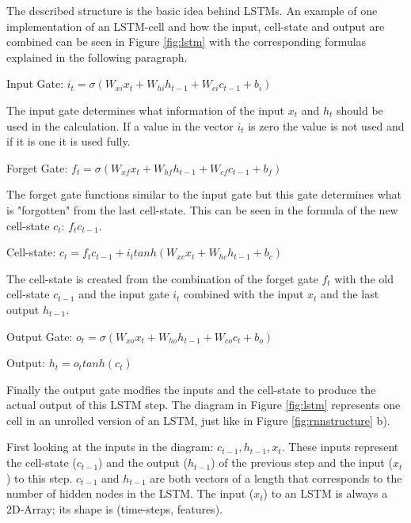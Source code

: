 The described structure is the basic idea behind LSTMs.
An example of one implementation of an LSTM-cell and how the input, cell-state and output are combined can be seen in Figure \ref{fig:lstm} with the corresponding formulas explained in the following paragraph.

\begin{displayquote}
		\item Input Gate: ${i}_{t}={\sigma}({W}_{xi}{x}_{t} + {W}_{hi}{h}_{t-1} + {W}_{ci}{c}_{t-1} + {b}_{i})$
\end{displayquote}
The input gate determines what information of the input $x_t$ and $h_t$ should be used in the calculation. If a value in the vector $i_t$ is zero the value is not used and if it is one it is used fully.
\begin{displayquote}
		\item Forget Gate:  ${f}_{t}={\sigma}({W}_{xf}{x}_{t} + {W}_{hf}{h}_{t-1} + {W}_{cf}{c}_{t-1} + {b}_{f})$
\end{displayquote}
The forget gate functions similar to the input gate but this gate determines what is "forgotten" from the last cell-state. This can be seen in the formula of the new cell-state $c_t$: ${f}_{t}{c}_{t-1}$.
\begin{displayquote}
		\item Cell-state: ${c}_{t}={f}_{t}{c}_{t-1} + {i}_{t}tanh({W}_{xc}{x}_{t} + {W}_{hc}{h}_{t-1}+{b}_{c})$
\end{displayquote}
The cell-state is created from the combination of the forget gate ${f}_{t}$ with the old cell-state ${c}_{t-1}$ and the input gate $i_t$ combined with the input $x_t$ and the last output $h_{t-1}$.
\begin{displayquote}
		\item Output Gate: ${o}_{t}={\sigma}({W}_{xo}{x}_{t} + {W}_{ho}{h}_{t-1} + {W}_{co}{c}_{t} + {b}_{o})$
		\item Output: ${h}_{t}={o}_{t}tanh({c}_{t})$
\end{displayquote}
Finally the output gate modfies the inputs and the cell-state to produce the actual output of this LSTM step.
The diagram in Figure \ref{fig:lstm} represents one cell in an unrolled version of an LSTM, just like in Figure \ref{fig:rnnstructure} b).

First looking at the inputs in the diagram: ${c}_{t-1}, {h}_{t-1}, {x}_{t}$.
These inputs represent the cell-state (${c}_{t-1}$) and the output (${h}_{t-1}$) of the previous step and the input (${x}_{t}$) to this step.
${c}_{t-1}$ and ${h}_{t-1}$ are both vectors of a length that corresponds to the number of hidden nodes in the LSTM.
The input (${x}_{t}$) to an LSTM is always a 2D-Array; its shape is (time-steps, features).


